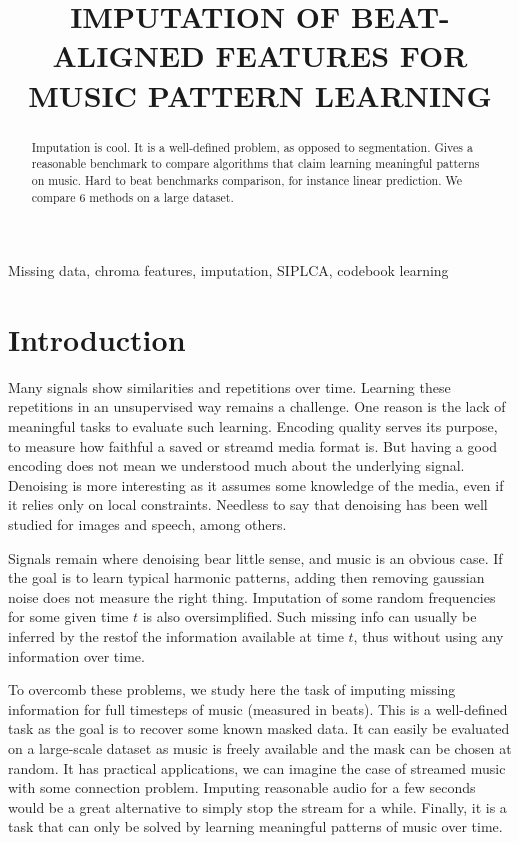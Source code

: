 \documentclass{article}
\title{IMPUTATION OF BEAT-ALIGNED FEATURES FOR MUSIC PATTERN LEARNING}
\begin{document}
%
\maketitle
%
\begin{abstract}
Imputation is cool. It is a well-defined problem, as opposed to segmentation.
Gives a reasonable benchmark to compare algorithms that claim learning meaningful
patterns on music. Hard to beat benchmarks comparison, for instance linear
prediction. We compare 6 methods on a large dataset.
\end{abstract}
%
\begin{keywords}
Missing data, chroma features, imputation, SIPLCA, codebook learning
\end{keywords}
%
\section{Introduction}
\label{sec:intro}
Many signals show similarities and repetitions over time. Learning these repetitions
in an unsupervised way remains a challenge. One reason is the lack of meaningful
tasks to evaluate such learning. Encoding quality serves its purpose, to measure
how faithful a saved or streamd media format is. But having a good encoding
does not mean we understood much about the underlying signal. Denoising is more
interesting as it assumes some knowledge of the media, even if it relies only on
local constraints. Needless to say that denoising has been well studied for images 
and speech, among others.

Signals remain where denoising bear little sense, and music is an obvious case.
If the goal is to learn typical harmonic patterns, adding then removing gaussian
noise does not measure the right thing. Imputation of some random frequencies
for some given time $t$ is also oversimplified. Such missing info can usually
be inferred by the restof the information available at time $t$, thus without
using any information over time.

To overcomb these problems, we study here the task of imputing missing information
for full timesteps of music (measured in beats). This is a well-defined task
as the goal is to recover some known masked data. It can easily be evaluated on a
large-scale dataset as music is freely available and the mask can be chosen
at random. It has practical applications, we can imagine the case of streamed music
with some connection problem. Imputing reasonable audio for a few seconds would
be a great alternative to simply stop the stream for a while. Finally, it is a
task that can only be solved by learning meaningful patterns of music over time.
\end{document}
